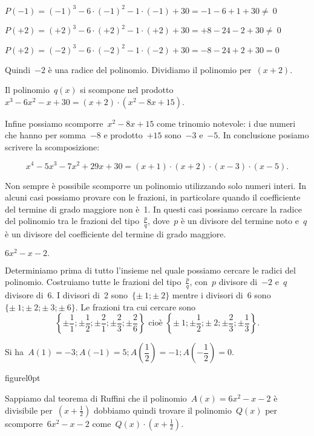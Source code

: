 $P(-1)=(-1)^{3}-6\cdot (-1)^{2}-1\cdot (-1)+30=-1-6+1+30\neq~0$

$P(+2)=(+2)^{3}-6\cdot (+2)^{2}-1\cdot (+2)+30=+8-24-2+30\neq~0$

$P(+2)=(-2)^{3}-6\cdot (-2)^{2}-1\cdot (-2)+30=-8-24+2+30=0$

\begin{multicols}{2}
 
Quindi~$-2$ è una radice del polinomio. Dividiamo il polinomio per~$(x+2)$.
\begin{center}
 
\end{center}

\end{multicols}

Il polinomio~$q(x)$ si scompone nel
prodotto~$x^{3}-6x^{2}-x+30=(x+2)\cdot (x^{2}-8x+15)$.

Infine possiamo scomporre~$x^{2}-8x+15$ come trinomio notevole: i due
numeri che hanno per somma~$-8$ e prodotto~$+15$ sono~$-3$ e~$-5$. In
conclusione posiamo scrivere la scomposizione:

\[x^{4}-5x^{3}-7x^{2}+29x+30=(x+1)\cdot (x+2)\cdot (x-3)\cdot (x-5).\]

Non sempre è possibile scomporre un polinomio utilizzando solo numeri
interi. In alcuni casi possiamo provare con le frazioni, in particolare
quando il coefficiente del termine di grado maggiore non è~1. In
questi casi possiamo cercare la radice del polinomio tra le frazioni
del tipo~$\frac{p}{q}$, dove~$p$ è un divisore del termine noto e~$q$ è
un divisore del coefficiente del termine di grado maggiore.


\begin{esempio}
$6x^{2}-x-2.$
\end{esempio}

Determiniamo prima di tutto l'insieme nel quale
possiamo cercare le radici del polinomio. Costruiamo tutte le frazioni
del tipo~$\frac{p}{q}$, con~$p$ divisore di~$-2$ e~$q$ divisore di~$6$. I
divisori di~2 sono~$\{\pm~1;\pm~2\}$ 
mentre i divisori di~6 sono~$\{\pm~1;\pm~2;\pm~3;\pm~6\}$.
Le frazioni tra cui cercare sono
\[\left\{\pm {\frac{1}{1}};\pm \frac{1}{2};\pm \frac{2}{1};\pm
\frac{2}{3};\pm \frac{2}{6}\right\}
\text{ cioè }
\left\{\pm~1;\pm\frac{1}{2};\pm~2;\pm \frac{2}{3};\pm \frac{1}{3}\right\}.\]

Si ha~$A(1)=-3; A(-1)=5; A\left(\dfrac{1}{2}\right)=
       -1; A\left(-{\dfrac{1}{2}}\right)=0$.

\begin{wrapfloat}{figure}{l}{0pt}
 
\end{wrapfloat}
Sappiamo dal teorema di Ruffini che il polinomio~$A(x)=6x^{2}-x-2$ è
divisibile per~$\left(x+\frac{1}{2}\right)$ dobbiamo quindi trovare il
polinomio~$Q(x)$ per scomporre~$6x^{2}-x-2$ 
come~$Q(x)\cdot \left(x+\frac{1}{2}\right)$.

